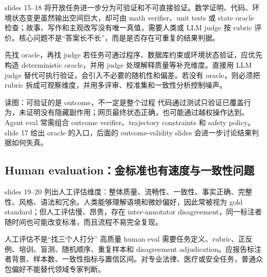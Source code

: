 slides 15--18 将开放任务进一步分为可验证和不可直接验证。数学证明、代码、环境状态变更虽然输出空间巨大，却可由 math verifier、unit tests 或 state oracle 检查；故事、写作和主观改写没有唯一真值，需要人类或 LLM judge 按 rubric 评价。核心问题不是“答案长不长”，而是是否存在可重复的结果判据。


\begin{importantbox}{先找 oracle，再找 judge}
若任务可通过程序、数据库约束或环境状态验证，应优先构造 deterministic oracle，并用 judge 处理解释质量等补充维度。直接用 LLM judge 替代可执行验证，会引入不必要的随机性和偏差。若没有 oracle，则必须把 rubric 拆成可观察维度，并用多评审、校准集和一致性分析控制噪声。
\end{importantbox}

\begin{knowledgebox}{读图：可验证的是 outcome，不一定是整个过程}
代码通过测试只验证已覆盖行为，未证明没有隐藏副作用；网页最终状态正确，也可能通过越权操作达到。Agent eval 常需组合 outcome verifier、trajectory constraints 和 safety policy。slide 17 给出 oracle 的入口，后面的 outcome-validity slides 会进一步讨论结果判据如何失真。
\end{knowledgebox}

\subsection{Human evaluation：金标准也有速度与一致性问题}

slides 19--20 列出人工评估维度：整体质量、流畅性、一致性、事实正确、完整性、风格、语法和冗余。人类能够理解语境和微妙偏好，因此常被视为 gold standard；但人工评估慢、昂贵，存在 inter-annotator disagreement，同一标注者随时间也可能改变标准，而且流程不易完全复现。


\begin{knowledgebox}{人工评估不是“找三个人打分”}
高质量 human eval 需要任务定义、rubric、正反例、培训、盲测、随机顺序、重复样本和 disagreement adjudication。应报告标注者背景、样本数、一致性指标与置信区间。对专业法律、医疗或安全任务，普通众包偏好不能替代领域专家判断。
\end{knowledgebox}

